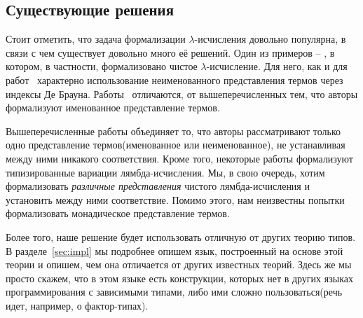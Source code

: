 \subsection{Существующие решения}

Стоит отметить, что задача формализации $\lambda$-исчисления довольно популярна, в связи с чем существует довольно много её решений. Один из примеров -- \cite{lambdaForm}, в котором, в частности, формализовано чистое $\lambda$-исчисление. Для него, как и для работ~\cite{shankar1988mechanical, altenkirch1993formalization, barras1996coq, nipkow1996more, huet1994residual} характерно использование неименованного представления термов через индексы Де Брауна. Работы~\cite{mckinna1999some, coquand1996algorithm, gabbay1999new, gordon1996five, sato1983theory, stoughton1988substitution} отличаются, от вышеперечисленных тем, что авторы формализуют именованное представление термов.

Вышеперечисленные работы объединяет то, что авторы рассматривают только одно представление термов(именованное или неименованное), не устанавливая между ними никакого соответствия. Кроме того, некоторые работы формализуют типизированные вариации лямбда-исчисления. Мы, в свою очередь, хотим формализовать \textit{различные представления} чистого лямбда-исчисления и установить между ними соответствие. Помимо этого, нам неизвестны попытки формализовать монадическое представление термов.

Более того, наше решение будет использовать отличную от других теорию типов. В разделе~\ref{sec:impl} мы подробнее опишем язык, построенный на основе этой теории и опишем, чем она отличается от других известных теорий. Здесь же мы просто скажем, что в этом языке есть конструкции, которых нет в других языках программирования с зависимыми типами, либо ими сложно пользоваться(речь идет, например, о фактор-типах).
